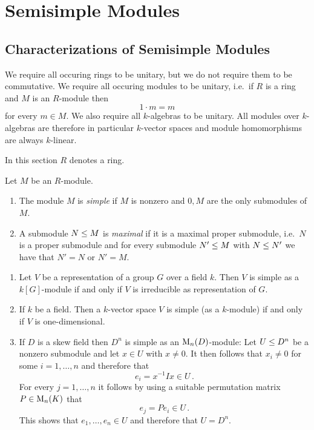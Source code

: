 \section{Semisimple Modules}





\subsection{Characterizations of Semisimple Modules}


\begin{conventions}
  We require all occuring rings to be unitary, but we do not require them to be commutative.
  We require all occuring modules to be unitary, i.e.\ if $R$ is a ring and $M$ is an $R$-module then
  \[
      1 \cdot m
    = m
  \]
  for every $m \in M$.
  We also require all $k$-algebras to be unitary.
  All modules over $k$-algebras are therefore in particular $k$-vector spaces and module homomorphisms are always $k$-linear.
\end{conventions}


\begin{conventions}
  In this section $R$ denotes a ring.
\end{conventions}


\begin{definition}
  Let $M$ be an $R$-module.
  \begin{enumerate}
    \item
      The module $M$ is \emph{simple} if $M$ is nonzero and $0, M$ are the only submodules of $M$.
    \item
      A submodule $N \leq M$ is \emph{maximal} if it is a maximal proper submodule, i.e.\ $N$ is a proper submodule and for every submodule $N' \leq M$ with $N \leq N'$ we have that $N' = N$ or $N' = M$.
  \end{enumerate}
\end{definition}


\begin{example}
  \leavevmode
  \begin{enumerate}
    \item
      Let $V$ be a representation of a group $G$ over a field $k$.
      Then $V$ is simple as a $k[G]$-module if and only if $V$ is irreducible as representation of $G$.
    \item
      If $k$ be a field.
      Then a $k$-vector space $V$ is simple (as a $k$-module) if and only if $V$ is one-dimensional.
    \item
      If $D$ is a skew field then $D^n$ is simple as an $\operatorname{M}_n(D)$-module:
      Let $U \leq D^n$ be a nonzero submodule and let $x \in U$ with $x \neq 0$.
      It then follows that $x_i \neq 0$ for some $i = 1, \dotsc, n$ and therefore that
      \[
            e_i
        =   x^{-1} I x
        \in U \,.
      \]
      For every $j = 1, \dotsc, n$ it follows by using a suitable permutation matrix $P \in \operatorname{M}_n(K)$ that
      \[
            e_j
        =   P e_i
        \in U \,.
      \]
      This shows that $e_1, \dotsc, e_n \in U$ and therefore that $U = D^n$.
  \end{enumerate}
\end{example}


